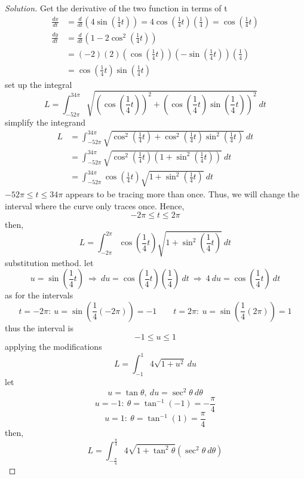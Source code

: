 \documentclass[12pt]{article}
\begin{document}
\begin{enumerate}[label=\arabic*.]
			\begin{proof}[Solution]
				Get the derivative of the two function in terms of t
				\begin{align*}
					\frac{dx}{dt} & = \frac{d}{dt}\left(4\sin\left(\frac{1}{4}t\right)\right) = 4\cos\left(\frac{1}{4}t\right)\left(\frac{1}{4}\right) = \cos\left(\frac{1}{4}t\right) \\
					\frac{dy}{dt} & = \frac{d}{dt}\left(1-2\cos^2\left(\frac{1}{4}t\right)\right) \\
					& = (-2)(2)\left(\cos\left(\frac{1}{4}t\right)\right)\left(-\sin \left(\frac{1}{4}t\right)\right)\left(\frac{1}{4}\right) \\
					& = \cos\left(\frac{1}{4}t\right)\sin\left(\frac{1}{4}t\right)
				\end{align*}
				set up the integral
				\[L = \int_{-52\pi}^{34\pi} \sqrt{\left(\cos\left(\frac{1}{4}t\right)\right)^2+\left(\cos\left(\frac{1}{4}t\right)\sin\left(\frac{1}{4}t\right)\right)^2}~dt\]
				simplify the integrand
				\begin{align*}
					L & = \int_{-52\pi}^{34\pi} \sqrt{\cos^2\left(\frac{1}{4}t\right)+\cos^2\left(\frac{1}{4}t\right)\sin^2\left(\frac{1}{4}t\right)}~dt \\
					& = \int_{-52\pi}^{34\pi} \sqrt{\cos^2\left(\frac{1}{4}t\right)\left(1+\sin^2\left(\frac{1}{4}t\right)\right)}~dt \\
					& = \int_{-52\pi}^{34\pi} \cos\left(\frac{1}{4}t\right)\sqrt{1+\sin^2\left(\frac{1}{4}t\right)}~dt
				\end{align*}
				\(-52\pi\leq t \leq 34\pi\) appears to be tracing more than once. Thus, we will change the interval where the curve only traces once. Hence,
				\[-2\pi\leq t \leq 2\pi\]
				then,
				\[L = \int_{-2\pi}^{2\pi} \cos \left(\frac{1}{4}t\right)\sqrt{1+\sin^2\left(\frac{1}{4}t\right)}~dt\]
				substitution method. let
				\[u = \sin \left(\frac{1}{4}t\right)~\Rightarrow~ du = \cos \left(\frac{1}{4}t\right)\left(\frac{1}{4}\right)~dt~\Rightarrow~4~du = \cos \left(\frac{1}{4}t\right)~dt\]
				as for the intervals
				\[t = -2\pi:~u = \sin\left(\frac{1}{4}(-2\pi)\right) = -1 \qquad t=2\pi:~u = \sin\left(\frac{1}{4}(2\pi)\right) = 1\]
				thus the interval is
				\[-1\leq u \leq 1\]
				applying the modifications
				\[L = \int_{-1}^{1} 4\sqrt{1+u^2}~du\]
				let
				\[u = \tan \theta,~ du = \sec^2 \theta~d\theta\] 
				\[u = -1:~ \theta = \tan^{-1}(-1) = -\frac{\pi}{4}\]
				\[u = 1:~ \theta = \tan^{-1}(1) = \frac{\pi}{4}\]
				then,
				\[L = \int_{-\frac{\pi}{4}}^{\frac{\pi}{4}} 4\sqrt{1+\tan^2\theta}\left(\sec^2\theta~d\theta\right)\]

\end{proof}
\end{enumerate}
\end{document}
